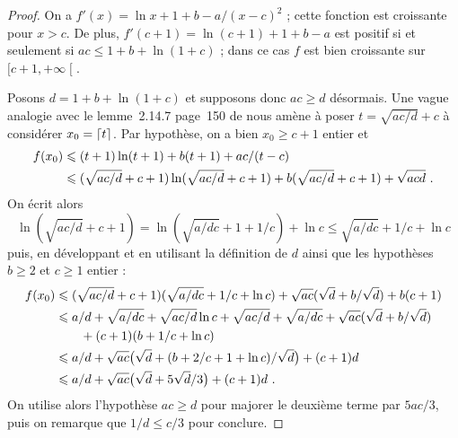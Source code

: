 \begin{proof}
  On a \( f'(x) = \ln x + 1 + b - a / (x-c)^2 \) ; cette fonction est
  croissante pour \( x > c \). De plus, \( f'(c+1) = \ln(c+1) + 1+b - a \) est
  positif si et seulement si \( ac \le 1 + b + \ln(1+c) \) ; dans ce cas \( f
  \) est bien croissante sur \( [c+1, +\infty \mathclose[ \).

  Posons \( d = 1 + b + \ln(1+c) \) et supposons donc \( ac \ge d \) désormais.
  Une vague analogie avec le lemme~2.14.7 page~150 de \cite{farhith} nous
  amène à poser \( t = \sqrt{ac/d} + c \) à considérer \( x_0 = \lceil t\rceil \).
  Par hypothèse, on a bien \( x_0 \ge c + 1 \) entier et
  \begin{align}
    f(x_0)
    & \leqslant
    (t+1) \ln(t+1)
    + b (t+1)
    + ac / (t-c)
    \\ & \leqslant
    (\sqrt{ac/d} + c+1) \ln(\sqrt{ac/d} + c+1)
    + b (\sqrt{ac/d} + c+1)
    + \sqrt{acd}
    \text{ .}
  \end{align}
  On écrit alors
  \begin{equation}
    \ln(\sqrt{ac/d} + c+1)
    =
    \ln(\sqrt{a/dc} + 1 + 1/c) + \ln c
    \le
    \sqrt{a/dc} + 1/c + \ln c
  \end{equation}
  puis, en développant et en utilisant la définition de \( d \) ainsi que les
  hypothèses \( b \ge 2 \) et \( c \ge 1 \) entier :
  \begin{align}
    f(x_0)
    & \leqslant
    (\sqrt{ac/d} + c+1) (\sqrt{a/dc} + 1/c + \ln c)
    + \sqrt{ac} (\sqrt d + b/\sqrt d)
    + b (c+1)
    \\ & \leqslant
    a/d + \sqrt{a/dc} + \sqrt{ac/d} \ln c
    + \sqrt{ac/d}
    + \sqrt{a/dc}
    + \sqrt{ac} (\sqrt d + b/\sqrt d)
    \\ & \qquad
    + (c+1) (b + 1/c + \ln c)
    \\ & \leqslant
    a/d
    + \sqrt{ac} \bigl( \sqrt d + (b + 2/c + 1 + \ln c) /\sqrt d \bigr)
    + (c+1) d
    \\ & \leqslant
    a/d
    + \sqrt{ac} \bigl( \sqrt d + 5\sqrt d / 3 \bigr)
    + (c+1) d
    \text{ .}
  \end{align}
  On utilise alors l'hypothèse \( ac \ge d \) pour majorer le deuxième terme
  par \( 5ac/ 3 \), puis on remarque que \( 1/d \le c/3 \) pour conclure.
\end{proof}

